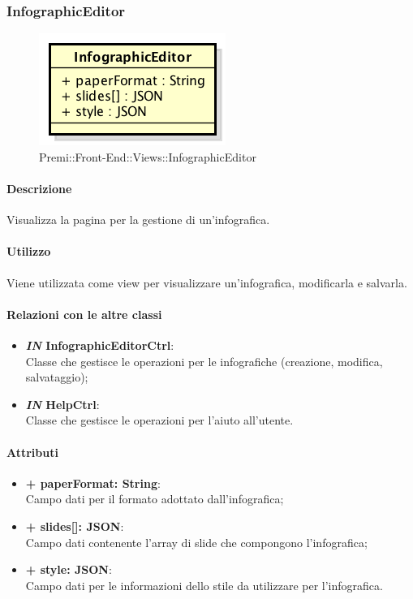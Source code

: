 \subsubsection{InfographicEditor}
	\begin{figure}[h]
		\centering
		\includegraphics[width=0.3\linewidth]{img/premi_front_end_views_infographiceditor}
		\caption[Premi::Front-End::Views::InfographicEditor]{Premi::Front-End::Views::InfographicEditor}
	\end{figure}
	
	\paragraph{Descrizione}
	Visualizza la pagina per la gestione di un'infografica.
	
	\paragraph{Utilizzo}
	Viene utilizzata come view per visualizzare un'infografica, modificarla e salvarla.
	
	\paragraph{Relazioni con le altre classi}
	\begin{itemize}
		\item \textbf{\textit{IN} InfographicEditorCtrl}:\\
			Classe che gestisce le operazioni per le infografiche (creazione, modifica, salvataggio);
		\item \textbf{\textit{IN} HelpCtrl}:\\
			Classe che gestisce le operazioni per l'aiuto all'utente.
	\end{itemize}
	
	\paragraph{Attributi}
	\begin{itemize}
		\item \textbf{+ paperFormat: String}:\\
			Campo dati per il formato adottato dall'infografica;
		\item \textbf{+ slides[]: JSON}:\\
			Campo dati contenente l'array di slide che compongono l'infografica;
		\item \textbf{+ style: JSON}:\\
		Campo dati per le informazioni dello stile da utilizzare per l'infografica.
	\end{itemize}
\newpage
	
